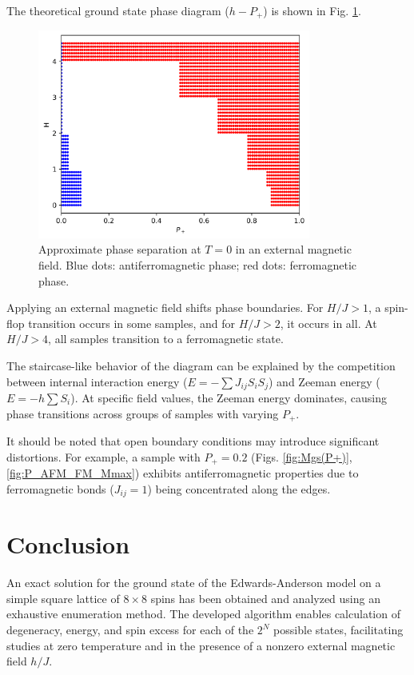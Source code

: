 \documentclass[utf8, babel, sor, jor, amsmath, amssymb, reprint]{elsarticle} %
\begin{document}
The theoretical ground state phase diagram ($h-P_+$) is shown in Fig. \ref{fig:P+_afm_fm(H)}.

\begin{figure}[H]
	\centering
	\includegraphics[width=0.8\textwidth]{images/P+_afm_fm(H)_filled.png}
	\caption{Approximate phase separation at $T = 0$ in an external magnetic field. Blue dots: antiferromagnetic phase; red dots: ferromagnetic phase.}
	\label{fig:P+_afm_fm(H)}
\end{figure}

Applying an external magnetic field shifts phase boundaries. For $H/J > 1$, a spin-flop transition occurs in some samples, and for $H/J > 2$, it occurs in all. At $H/J > 4$, all samples transition to a ferromagnetic state.

The staircase-like behavior of the diagram can be explained by the competition between internal interaction energy ($E = -\sum J_{ij} S_i S_j$) and Zeeman energy ($E = - h \sum S_i$). At specific field values, the Zeeman energy dominates, causing phase transitions across groups of samples with varying $P_+$.

It should be noted that open boundary conditions may introduce significant distortions. For example, a sample with $P_+ = 0.2$ (Figs. \ref{fig:Mgs(P+)}, \ref{fig:P_AFM_FM_Mmax}) exhibits antiferromagnetic properties due to ferromagnetic bonds ($J_{ij} = 1$) being concentrated along the edges.

\section{Conclusion}

An exact solution for the ground state of the Edwards-Anderson model on a simple square lattice of $8 \times 8$ spins has been obtained and analyzed using an exhaustive enumeration method. The developed algorithm enables calculation of degeneracy, energy, and spin excess for each of the $2^N$ possible states, facilitating studies at zero temperature and in the presence of a nonzero external magnetic field $h/J$.
\end{document}
